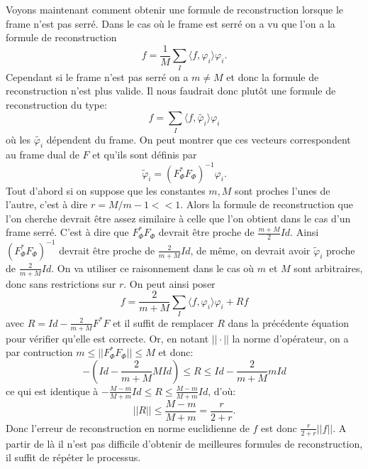 Voyons maintenant comment obtenir une formule de reconstruction lorsque le frame n'est pas serré. Dans le cas où le frame est serré on a vu que l'on a la formule de reconstruction
\begin{equation}
	f= \frac{1}{M}\sum_I \langle f, \varphi_i \rangle \varphi_i.
\end{equation}
Cependant si le frame n'est pas serré on a $m\neq M$ et donc la formule de reconstruction n'est plus valide.
Il nous faudrait donc plutôt une formule de reconstruction du type:
\begin{equation}
	f= \sum_I \langle f, \tilde{\varphi_i} \rangle \varphi_i
\end{equation}
où les $\tilde{\varphi_i}$ dépendent du frame.
On peut montrer que ces vecteurs correspondent au frame dual de $F$ et qu'ils sont définis par
\begin{equation}
	\tilde{\varphi}_i = (F_\Phi^*F_\Phi)^{-1} \varphi_i.
\end{equation}
Tout d'abord si on suppose que les constantes $m,M$ sont proches l'unes de l'autre, c'est à dire $r=M/m - 1 <<1$.
Alors la formule de reconstruction que l'on cherche devrait être assez similaire à celle que l'on obtient dans le cas d'un frame serré.
C'est à dire que $F_\Phi^* F_\Phi$ devrait être proche de $\frac{m+M}{2}Id$.
Ainsi $(F_\Phi^*F_\Phi)^{-1}$ devrait être proche de $\frac{2}{m+M}Id$, de même, on devrait avoir $\tilde{\varphi}_i$ proche de $\frac{2}{m+M}Id$.
On va utiliser ce raisonnement dans le cas où $m$ et $M$ sont arbitraires, donc sans restrictions sur $r$. 
On peut ainsi poser
\begin{equation}
	f = \frac{2}{m+M}\sum_I \langle f, \varphi_i \rangle \varphi_i + Rf 
\end{equation}
avec $R = Id - \frac{2}{m+M}F^*F$ et il suffit de remplacer $R$ dans la précédente équation pour vérifier qu'elle est correcte.
Or, en notant $||\cdot||$ la norme d'opérateur, on a par contruction $m \leq ||F_\Phi^*F_\Phi|| \leq  M$ et donc:
\begin{equation}
	-(Id - \frac{2}{m+M}M Id) \leq R \leq Id- \frac{2}{m+M}mId 
\end{equation}
ce qui est identique à $-\frac{M-m}{M+m}Id \leq R \leq \frac{M-m}{M+m}Id$, d'où:
\begin{equation}
	||R||\leq \frac{M-m}{M+m} = \frac{r}{2+r}.
\end{equation}
Donc l'erreur de reconstruction en norme euclidienne de $f$ est donc $\frac{r}{2+r}||f||$.
A partir de là il n'est pas difficile d'obtenir de meilleures formules de reconstruction, il suffit de répéter le processus.
